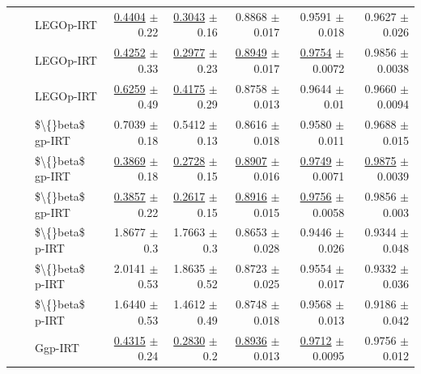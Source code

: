 \begin{longtable}{llp{}rrrrr}
 &  & LEGOp-IRT & \underline{0.4404} {\scriptsize $\pm$ 0.22} & \underline{0.3043} {\scriptsize $\pm$ 0.16} & 0.8868 {\scriptsize $\pm$ 0.017} & 0.9591 {\scriptsize $\pm$ 0.018} & 0.9627 {\scriptsize $\pm$ 0.026} \\
 &  & LEGOp-IRT & \underline{0.4252} {\scriptsize $\pm$ 0.33} & \underline{0.2977} {\scriptsize $\pm$ 0.23} & \underline{0.8949} {\scriptsize $\pm$ 0.017} & \underline{0.9754} {\scriptsize $\pm$ 0.0072} & 0.9856 {\scriptsize $\pm$ 0.0038} \\
 &  & LEGOp-IRT & \underline{0.6259} {\scriptsize $\pm$ 0.49} & \underline{0.4175} {\scriptsize $\pm$ 0.29} & 0.8758 {\scriptsize $\pm$ 0.013} & 0.9644 {\scriptsize $\pm$ 0.01} & 0.9660 {\scriptsize $\pm$ 0.0094} \\
 &  & \$\textbackslash\{\}beta\$ gp-IRT & 0.7039 {\scriptsize $\pm$ 0.18} & 0.5412 {\scriptsize $\pm$ 0.13} & 0.8616 {\scriptsize $\pm$ 0.018} & 0.9580 {\scriptsize $\pm$ 0.011} & 0.9688 {\scriptsize $\pm$ 0.015} \\
 &  & \$\textbackslash\{\}beta\$ gp-IRT & \underline{0.3869} {\scriptsize $\pm$ 0.18} & \underline{0.2728} {\scriptsize $\pm$ 0.15} & \underline{0.8907} {\scriptsize $\pm$ 0.016} & \underline{0.9749} {\scriptsize $\pm$ 0.0071} & \underline{0.9875} {\scriptsize $\pm$ 0.0039} \\
 &  & \$\textbackslash\{\}beta\$ gp-IRT & \underline{0.3857} {\scriptsize $\pm$ 0.22} & \underline{0.2617} {\scriptsize $\pm$ 0.15} & \underline{0.8916} {\scriptsize $\pm$ 0.015} & \underline{0.9756} {\scriptsize $\pm$ 0.0058} & 0.9856 {\scriptsize $\pm$ 0.003} \\
 &  & \$\textbackslash\{\}beta\$ p-IRT & 1.8677 {\scriptsize $\pm$ 0.3} & 1.7663 {\scriptsize $\pm$ 0.3} & 0.8653 {\scriptsize $\pm$ 0.028} & 0.9446 {\scriptsize $\pm$ 0.026} & 0.9344 {\scriptsize $\pm$ 0.048} \\
 &  & \$\textbackslash\{\}beta\$ p-IRT & 2.0141 {\scriptsize $\pm$ 0.53} & 1.8635 {\scriptsize $\pm$ 0.52} & 0.8723 {\scriptsize $\pm$ 0.025} & 0.9554 {\scriptsize $\pm$ 0.017} & 0.9332 {\scriptsize $\pm$ 0.036} \\
 &  & \$\textbackslash\{\}beta\$ p-IRT & 1.6440 {\scriptsize $\pm$ 0.53} & 1.4612 {\scriptsize $\pm$ 0.49} & 0.8748 {\scriptsize $\pm$ 0.018} & 0.9568 {\scriptsize $\pm$ 0.013} & 0.9186 {\scriptsize $\pm$ 0.042} \\
 &  & Ggp-IRT & \underline{0.4315} {\scriptsize $\pm$ 0.24} & \underline{0.2830} {\scriptsize $\pm$ 0.2} & \underline{0.8936} {\scriptsize $\pm$ 0.013} & \underline{0.9712} {\scriptsize $\pm$ 0.0095} & 0.9756 {\scriptsize $\pm$ 0.012} \\

\end{longtable}
